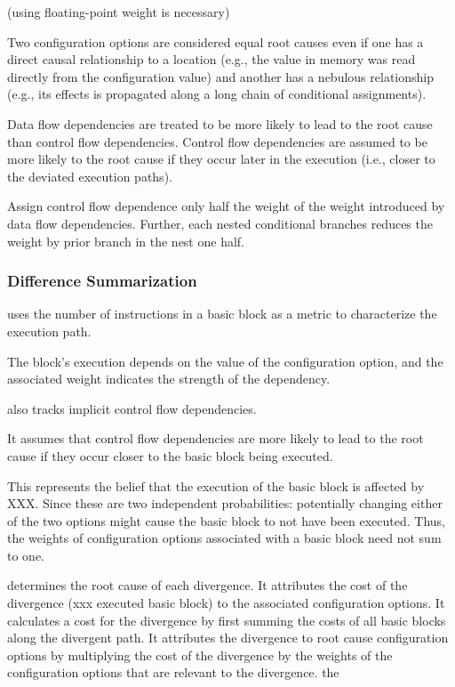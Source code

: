 (using floating-point weight is necessary)

Two configuration options are considered equal
root causes even if one has a direct causal
relationship to a location (e.g., the value
in memory was read directly from the configuration value)
and another has a nebulous relationship (e.g., 
its effects is propagated along a long chain
of conditional assignments).

Data flow dependencies are treated to be more likely
to lead to the root cause than control flow
dependencies. Control flow dependencies are assumed
to be more likely to the root cause if they occur
later in the execution (i.e., closer to the
deviated execution paths).

Assign control flow dependence only half the weight
of the weight introduced by data flow dependencies.
Further, each nested conditional branches reduces
the weight by prior branch in the nest one half.

\subsubsection{Difference Summarization}




\ourtool uses the number of instructions in a basic
block as a metric to characterize the execution path.

The block's execution depends on the value of
the configuration option, and the associated weight
indicates the strength of the dependency.


\ourtool also tracks implicit control flow dependencies.

It assumes that control flow dependencies are more likely
to lead to the root cause if they
occur closer to the basic block being executed.

This represents the belief that the execution of
the basic block is affected by XXX.
Since these are two independent probabilities:
potentially changing either of the two options
might cause the basic block to not have been executed.
Thus, the weights of configuration options associated
with a basic block need not sum to one.

\ourtool determines the root cause of each divergence.
It attributes the cost of the divergence (xxx executed
basic block) to the associated configuration options.
It calculates a cost for the divergence by first summing
the costs of all basic blocks along the divergent
path. It attributes the divergence
to root cause configuration options by multiplying
the cost of the divergence by the weights of the configuration
options that are relevant to the divergence.
the 

